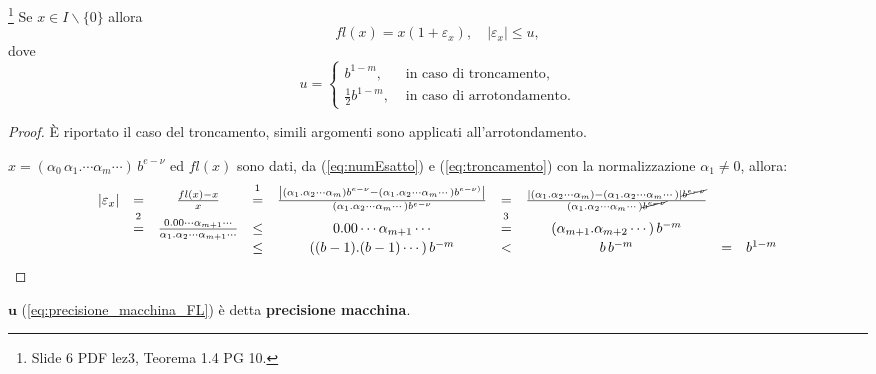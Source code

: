 \begin{theorem} \footnote{Slide 6 PDF lez3, Teorema 1.4 PG 10.}\label{th:precisione_macchina_FL}
	Se $x\in I\backslash\{ 0\}$ allora
	\begin{equation*}
		fl(x)=x(1+\varepsilon_x), \quad |\varepsilon_x|\leq u,
	\end{equation*}
	dove
	\begin{equation}\label{eq:precisione_macchina_FL}
		u=
		\begin{cases}
			b^{1-m}, &\text{ in caso di troncamento},\\
			\frac{1}{2}b^{1-m}, &\text{ in caso di arrotondamento}.
		\end{cases}
	\end{equation} 
\end{theorem}
\begin{proof}
	È riportato il caso del troncamento, simili argomenti sono applicati all'arrotondamento.
	
	$x=(\alpha_0\,\alpha_1.\cdots\alpha_m\cdots)\,b^{e-\nu}$ ed $fl(x)$ sono dati, da (\ref{eq:numEsatto}) e (\ref{eq:troncamento}) con la normalizzazione $\alpha_1\neq 0$, allora:
	\begin{equation*}
		\begin{matrix}
			|\varepsilon_x|&=&\frac{fl(x)-x}{x}&\overset{\footnotemark}{=}&\frac{\left|(\alpha_1.\alpha_2\cdots\alpha_m)b^{e-\nu}-(\alpha_1.\alpha_2\cdots\alpha_m\cdots)b^{e-\nu)}\right|}{(\alpha_1.\alpha_2\cdots\alpha_m\cdots)b^{e-\nu}}
			&=&\frac{|(\alpha_1.\alpha_2\cdots\alpha_m)-(\alpha_1.\alpha_2\cdots\alpha_m\cdots)|\cancel{b^{e-\nu}}}{(\alpha_1.\alpha_2\cdots\alpha_m\cdots)\cancel{b^{e-\nu}}}\\
			&\overset{\footnotemark}{=}&\frac{0.00\cdots\alpha_{m+1}\cdots}{\alpha_1.\alpha_2\cdots\alpha_{m+1}\cdots}&\leq& 0.00\cdots\alpha_{m+1}\cdots &\overset{\footnotemark}{=}&(\alpha_{m+1}.\alpha_{m+2}\cdots)\, b^{-m}\\
			&&&\leq&((b-1).(b-1)\cdots)\, b^{-m}&<&b\, b^{-m}&=& b^{1-m}
		\end{matrix}
	\end{equation*}
\end{proof}
\begin{definition}
	$\boldsymbol u$ (\ref{eq:precisione_macchina_FL}) è detta \textbf{precisione macchina}.
\end{definition}

